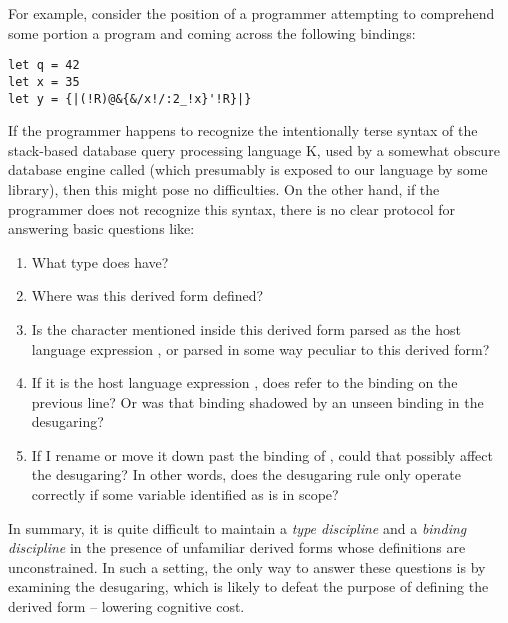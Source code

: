 For example, consider the position of a programmer attempting to comprehend some portion a program and coming across the following bindings:

\begin{lstlisting}[numbers=none]
let q = 42
let x = 35
let y = {|(!R)@&{&/x!/:2_!x}'!R}|}
\end{lstlisting}

If the programmer happens to recognize the intentionally terse syntax of the stack-based database query processing language K, used by a somewhat obscure database engine called  (which presumably is exposed to our language by some library), then this might pose no difficulties. On the other hand, if the programmer does not recognize this syntax, there is no clear protocol for answering basic questions like:

\begin{enumerate}
\item What type does  have?
\item Where was this derived form defined?
\item Is the character  mentioned inside this derived form parsed as the host language expression , or parsed in some way peculiar to this derived form?
\item If it is the host language expression , does  refer to the binding on the previous line? Or was that binding shadowed by an unseen binding in the desugaring?
\item If I rename  or move it down past the binding of , could that possibly affect the desugaring? In other words, does the desugaring rule only operate correctly if  some variable identified as  is in scope?
\end{enumerate}

In summary, it is quite difficult to maintain a \emph{type discipline} and a \emph{binding discipline} in the presence of unfamiliar derived forms whose definitions are unconstrained. In such a setting, the only way to answer these questions is by examining the desugaring, which is likely to defeat the purpose of defining the derived form -- lowering cognitive cost. 


